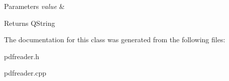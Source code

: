 \begin{DoxyParams}{Parameters}
{\em value} & \\
\hline
\end{DoxyParams}
\begin{DoxyReturn}{Returns}
Q\+String 
\end{DoxyReturn}


The documentation for this class was generated from the following files\+:\begin{DoxyCompactItemize}
\item 
pdfreader.\+h\item 
pdfreader.\+cpp\end{DoxyCompactItemize}
